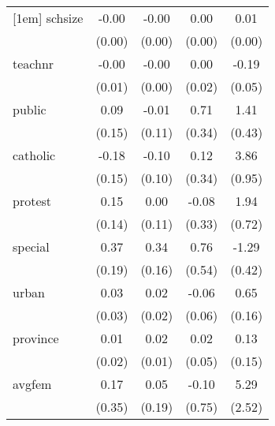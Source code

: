 \documentclass{article}
\begin{document}
{\begin{tabular}{l*{4}{c}}
[1em]
schsize     &       -0.00         &       -0.00         &        0.00         &        0.01\sym{*}  \\
            &      (0.00)         &      (0.00)         &      (0.00)         &      (0.00)         \\
[1em]
teachnr     &       -0.00         &       -0.00         &        0.00         &       -0.19\sym{***}\\
            &      (0.01)         &      (0.00)         &      (0.02)         &      (0.05)         \\
[1em]
public      &        0.09         &       -0.01         &        0.71\sym{**} &        1.41\sym{***}\\
            &      (0.15)         &      (0.11)         &      (0.34)         &      (0.43)         \\
[1em]
catholic    &       -0.18         &       -0.10         &        0.12         &        3.86\sym{***}\\
            &      (0.15)         &      (0.10)         &      (0.34)         &      (0.95)         \\
[1em]
protest     &        0.15         &        0.00         &       -0.08         &        1.94\sym{***}\\
            &      (0.14)         &      (0.11)         &      (0.33)         &      (0.72)         \\
[1em]
special     &        0.37\sym{*}  &        0.34\sym{**} &        0.76         &       -1.29\sym{***}\\
            &      (0.19)         &      (0.16)         &      (0.54)         &      (0.42)         \\
[1em]
urban       &        0.03         &        0.02         &       -0.06         &        0.65\sym{***}\\
            &      (0.03)         &      (0.02)         &      (0.06)         &      (0.16)         \\
[1em]
province    &        0.01         &        0.02\sym{*}  &        0.02         &        0.13         \\
            &      (0.02)         &      (0.01)         &      (0.05)         &      (0.15)         \\
[1em]
avgfem      &        0.17         &        0.05         &       -0.10         &        5.29\sym{**} \\
            &      (0.35)         &      (0.19)         &      (0.75)         &      (2.52)         \\

\end{tabular}}
\end{document}
